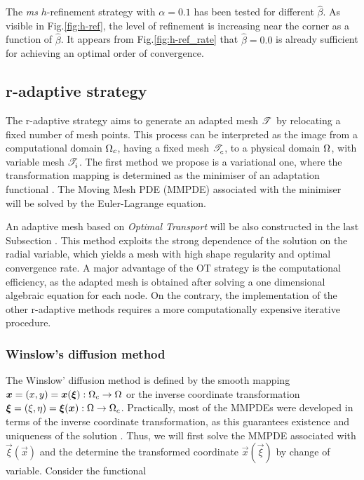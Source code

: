 \documentclass[a4paper,11pt]{article}
\begin{document}
The \textit{ms} $h$-refinement strategy with $\alpha = 0.1$ has been tested for different $\hat{\beta}$. As visible in Fig.\ref{fig:h-ref}, the level of refinement is increasing near the corner as a function of $\hat{\beta}$. It appears from Fig.\ref{fig:h-ref_rate} that $\hat{\beta} = 0.0$ is already sufficient for achieving an optimal order of convergence.


\subsection{r-adaptive strategy}
\label{sec:r-adaptive}
The r-adaptive strategy aims to generate an adapted mesh $\mathscr T^{}$ by relocating a fixed number of mesh points. This process can be interpreted as the image from a computational domain $\Omega_{c}$, having a fixed mesh $\mathscr T^{}_{c}$, to a physical domain $\Omega$, with variable mesh $\mathscr T^{}_{i}$. The first method we propose is a variational one, where the transformation mapping is determined as the minimiser of an adaptation functional \cite{BHR:2009,Winslow:1966}. The Moving Mesh PDE (MMPDE) associated with the minimiser will be solved by the Euler-Lagrange equation.


An adaptive mesh based on \textit{Optimal Transport} will be also constructed in the last Subsection \cite{BHR:2009}. This method exploits the strong dependence of the solution on the radial variable, which yields a mesh with high shape regularity and optimal convergence rate. A major advantage of the OT strategy is the computational efficiency, as the adapted mesh is obtained after solving a one dimensional algebraic equation for each node. On the contrary, the implementation of the other r-adaptive methods requires a more computationally expensive iterative procedure. 

\subsubsection{Winslow's diffusion method}
\label{sec:Wins}
The Winslow' diffusion method is defined by the smooth mapping $\boldsymbol x = (x,y) = \boldsymbol x(\boldsymbol \xi) : \Omega_{c} \rightarrow \Omega$ or the inverse coordinate
transformation $\boldsymbol \xi = (\xi,\eta) =  \boldsymbol \xi(\boldsymbol x) : \Omega \rightarrow
\Omega_{c}$. Practically, most of the MMPDEs were developed in terms of
the inverse coordinate transformation, as this guarantees existence
and uniqueness of the solution \cite{Winslow:1966,Dvinsky:1991}. Thus, we will first solve the MMPDE associated with $\vec{\xi}(\vec{x})$ and the determine the transformed coordinate $\vec{x}(\vec{\xi})$ by change of variable. Consider the functional
\end{document}

